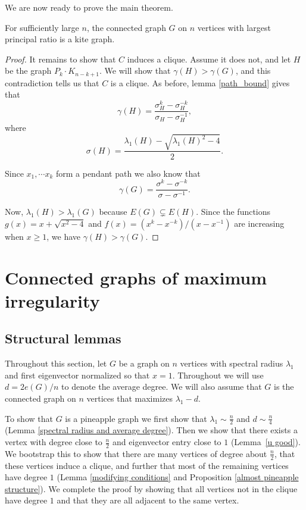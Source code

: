 We are now ready to prove the main theorem.

{
\renewcommand{\thetheorem}{1}
\begin{theorem}
  For sufficiently large $n$, the connected graph $G$ on $n$
  vertices with largest principal ratio is a kite graph.
\end{theorem}
\addtocounter{theorem}{-1}
}
\begin{proof}
  It remains to show that $C$ induces a clique. Assume it does not, and let $H$ be the graph $P_k \cdot K_{n-k+1}$. We will show
  that $\gamma(H) > \gamma(G)$, and this contradiction tells us that $C$ is a clique. As before, lemma \ref{path_bound} gives that
\[
\gamma(H)  = \frac{\sigma_H^k - \sigma_H^{-k}}{\sigma_H - \sigma_H^{-1}},
\]
where
\[
\sigma(H) = \frac{\lambda_1(H) - \sqrt{\lambda_1(H)^2 -4}}{2}.
\]

Since $x_1,\cdots x_k$ form a pendant path we also know that 
\[
\gamma(G) = \frac{\sigma^k - \sigma^{-k}}{\sigma - \sigma^{-1}}.
\]

Now, $\lambda_1(H) > \lambda_1(G)$ because $E(G) \subsetneq E(H)$. Since the functions $g(x) = x+\sqrt{x^2-4}$ and $f(x) = (x^k - x^{-k})/(x-x^{-1})$ are increasing when $x\geq 1$, we have $\gamma(H) > \gamma(G)$.

 \end{proof}



\section{Connected graphs of maximum irregularity}\label{pineapple}

\subsection{Structural lemmas}
Throughout this section, let $G$ be a graph on $n$ vertices with spectral radius $\lambda_1$ and first eigenvector normalized so that $x=1$. Throughout we will use $d = 2e(G)/n$ to denote the average degree. We will also assume that $G$ is the connected graph on $n$ vertices that maximizes $\lambda_1 - d$.

To show that $G$ is a pineapple graph we first show that $\lambda_1 \sim \frac{n}{2}$ and $d\sim \frac{n}{4}$ (Lemma \ref{spectral radius and average degree}). Then we show that there exists a vertex with degree close to $\frac{n}{2}$ and eigenvector entry close to $1$ (Lemma~\ref{u good}). We bootstrap this to show that there are many vertices of degree about $\frac{n}{2}$, that these vertices induce a clique, and further that most of the remaining vertices have degree $1$ (Lemma \ref{modifying conditions} and Proposition \ref{almost pineapple structure}).  We complete the proof by showing that all vertices not in the clique have degree $1$ and that they are all adjacent to the same vertex.

